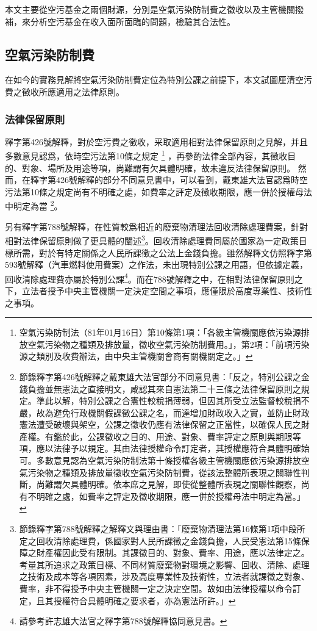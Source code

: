 \documentclass[12pt,a4paper]{article}
\begin{document}
本文主要從空污基金之兩個財源，分別是空氣污染防制費之徵收以及主管機關撥補，來分析空污基金在收入面所面臨的問題，檢驗其合法性。

\subsection{空氣污染防制費}

在如今的實務見解將空氣污染防制費定位為特別公課之前提下，本文試圖厘清空污費之徵收所應適用之法律原則。

\subsubsection{法律保留原則}

釋字第426號解釋，對於空污費之徵收，采取適用相對法律保留原則之見解，并且多數意見認爲，依時空污法第10條之規定
\footnote{空氣污染防制法（81年01月16日）第10條第1項：「各級主管機關應依污染源排放空氣污染物之種類及排放量，徵收空氣污染防制費用。」，第2項：「前項污染源之類別及收費辦法，由中央主管機關會商有關機關定之。」}
，再參酌法律全部內容，其徵收目的、對象、場所及用途等項，尚難謂有欠具體明確，故未違反法律保留原則。
然而，在釋字第426號解釋的部分不同意見書中，可以看到，戴東雄大法官認爲時空污法第10條之規定尚有不明確之處，如費率之評定及徵收期限，應一併於授權母法中明定為當
\footnote{節錄釋字第426號解釋之戴東雄大法官部分不同意見書：「反之，特別公課之金錢負擔並無憲法之直接明文，咸認其來自憲法第二十三條之法律保留原則之規定。準此以解，特別公課之合憲性較稅捐薄弱，但因其所受立法監督較稅捐不嚴，故為避免行政機關假課徵公課之名，而達增加財政收入之實，並防止財政憲法遭受破壞與架空，公課之徵收仍應有法律保留之正當性，以確保人民之財產權。有鑑於此，公課徵收之目的、用途、對象、費率評定之原則與期限等項，應以法律予以規定。其由法律授權命令訂定者，其授權應符合具體明確始可。多數意見認為空氣污染防制法第十條授權各級主管機關應依污染源排放空氣污染物之種類及排放量徵收空氣污染防制費，從該法整體所表現之關聯性判斷，尚難謂欠具體明確。依本席之見解，即使從整體所表現之關聯性觀察，尚有不明確之處，如費率之評定及徵收期限，應一併於授權母法中明定為當。」}。



另有釋字第788號解釋，在性質較爲相近的廢棄物清理法回收清除處理費案，針對相對法律保留原則做了更具體的闡述\footnote{節錄釋字第788號解釋之解釋文與理由書：「廢棄物清理法第16條第1項中段所定之回收清除處理費，係國家對人民所課徵之金錢負擔，人民受憲法第15條保障之財產權因此受有限制。其課徵目的、對象、費率、用途，應以法律定之。考量其所追求之政策目標、不同材質廢棄物對環境之影響、回收、清除、處理之技術及成本等各項因素，涉及高度專業性及技術性，立法者就課徵之對象、費率，非不得授予中央主管機關一定之決定空間。故如由法律授權以命令訂定，且其授權符合具體明確之要求者，亦為憲法所許。」}。回收清除處理費同屬於國家為一定政策目標所需，對於有特定關係之人民所課徵之公法上金錢負擔。雖然解釋文仿照釋字第593號解釋（汽車燃料使用費案）之作法，未出現特別公課之用語，但依據定義，回收清除處理費亦屬於特別公課\footnote{請參考許志雄大法官之釋字第788號解釋協同意見書。}。而在788號解釋之中，在相對法律保留原則之下，立法者授予中央主管機關一定決定空間之事項，應僅限於高度專業性、技術性之事項。
\end{document}
